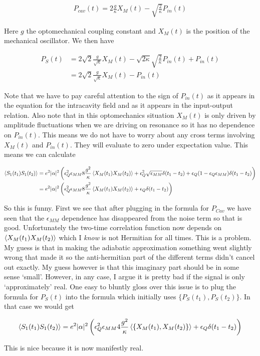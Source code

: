 \documentclass[12pt]{article}
\begin{document}
\begin{align}
P_{cav}(t) = 2 \frac{g}{\kappa}X_M(t) - \sqrt{\frac{2}{\kappa}} P_{in}(t)
\end{align}

Here $g$ the optomechanical coupling constant and $X_M(t)$ is the position of the mechanical oscillator. We then have

\begin{align}
P_S(t) &= 2\sqrt{2} \frac{g}{\sqrt{\kappa}} X_M(t) -\sqrt{2\kappa}\sqrt{\frac{2}{\kappa}}P_{in}(t) + P_{in}(t)\\
&= 2 \sqrt{2} \frac{g}{\sqrt{\kappa}}X_M(t) - P_{in}(t)
\end{align}

Note that we have to pay careful attention to the sign of $P_{in}(t)$ as it appears in the equation for the intracavity field and as it appears in the input-output relation. Also note that in this optomechanics situation $X_M(t)$ is only driven by amplitude fluctuations when we are driving on resonance so it has no dependence on $P_{in}(t)$. This means we do not have to worry about any cross terms involving $X_M(t)$ and $P_{in}(t)$. They will evaluate to zero under expectation value. This means we can calculate

\begin{align}
\Braket{S_1(t_1)S_1(t_2)} &= e^2|\alpha|^2\left(\epsilon_Q^2 \epsilon_{MM} 8\frac{g^2}{\kappa}\Braket{X_M(t_1)X_M(t_2)} + \epsilon_Q^2\sqrt{\epsilon_{MM}} \delta(t_1-t_2) +  \epsilon_Q(1-\epsilon_Q\epsilon_{MM})\delta(t_1-t_2) \right)\\
&= e^2|\alpha|^2\left(\epsilon_Q^2 \epsilon_{MM} 8\frac{g^2}{\kappa}\Braket{X_M(t_1)X_M(t_2)} +  \epsilon_Q\delta(t_1-t_2) \right)\\
\end{align}

So this is funny. First we see that after plugging in the formula for $P_{Cav}$ we have seen that the $\epsilon_{MM}$ dependence has disappeared from the noise term so that is good. Unfortunately the two-time correlation function now depends on $\Braket{X_M(t_1)X_M(t_2)}$ which I \textit{know} is not Hermitian for all times. This is a problem. My guess is that in making the adiabatic approximation something went slightly wrong that made it so the anti-hermitian part of the different terms didn't cancel out exactly. My guess however is that this imaginary part should be in some sense `small'. However, in any case, I argue it is pretty bad if the signal is only `approximately' real. One easy to bluntly gloss over this issue is to plug the formula for $P_S(t)$ into the formula which initially uses $\{P_S(t_1),P_S(t_2)\}$. In that case we would get

\begin{align}
\Braket{S_1(t_1)S_1(t_2)} = e^2|\alpha|^2\left(\epsilon_Q^2 \epsilon_{MM} 4\frac{g^2}{\kappa}\Braket{\left\{X_M(t_1),X_M(t_2)\right\}} +  \epsilon_Q\delta(t_1-t_2) \right)\\ 
\end{align}

This is nice because it is now manifestly real.
\end{document}
